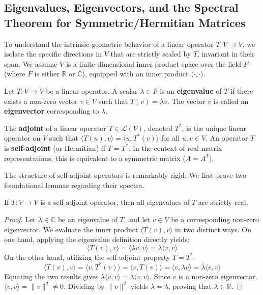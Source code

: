 \subsection{Eigenvalues, Eigenvectors, and the Spectral Theorem for Symmetric/Hermitian Matrices}

To understand the intrinsic geometric behavior of a linear operator $T: V \to V$, we isolate the specific directions in $V$ that are strictly scaled by $T$, invariant in their span. We assume $V$ is a finite-dimensional inner product space over the field $F$ (where $F$ is either $\mathbb{R}$ or $\mathbb{C}$), equipped with an inner product $\langle \cdot, \cdot \rangle$.

\begin{definition}
Let $T: V \to V$ be a linear operator. A scalar $\lambda \in F$ is an \textbf{eigenvalue} of $T$ if there exists a non-zero vector $v \in V$ such that $T(v) = \lambda v$. The vector $v$ is called an \textbf{eigenvector} corresponding to $\lambda$.
\end{definition}

\begin{definition}
The \textbf{adjoint} of a linear operator $T \in \mathcal{L}(V)$, denoted $T^*$, is the unique linear operator on $V$ such that $\langle T(u), v \rangle = \langle u, T^*(v) \rangle$ for all $u, v \in V$. An operator $T$ is \textbf{self-adjoint} (or Hermitian) if $T = T^*$. In the context of real matrix representations, this is equivalent to a symmetric matrix ($A = A^T$).
\end{definition}

The structure of self-adjoint operators is remarkably rigid. We first prove two foundational lemmas regarding their spectra.

\begin{lemma}
If $T: V \to V$ is a self-adjoint operator, then all eigenvalues of $T$ are strictly real.
\end{lemma}

\begin{proof}
Let $\lambda \in \mathbb{C}$ be an eigenvalue of $T$, and let $v \in V$ be a corresponding non-zero eigenvector. We evaluate the inner product $\langle T(v), v \rangle$ in two distinct ways. On one hand, applying the eigenvalue definition directly yields:
\[
\langle T(v), v \rangle = \langle \lambda v, v \rangle = \lambda \langle v, v \rangle
\]
On the other hand, utilizing the self-adjoint property $T = T^*$:
\[
\langle T(v), v \rangle = \langle v, T^*(v) \rangle = \langle v, T(v) \rangle = \langle v, \lambda v \rangle = \overline{\lambda} \langle v, v \rangle
\]
Equating the two results gives $\lambda \langle v, v \rangle = \overline{\lambda} \langle v, v \rangle$. Since $v$ is a non-zero eigenvector, $\langle v, v \rangle = \|v\|^2 \neq 0$. Dividing by $\|v\|^2$ yields $\lambda = \overline{\lambda}$, proving that $\lambda \in \mathbb{R}$.
\end{proof}

